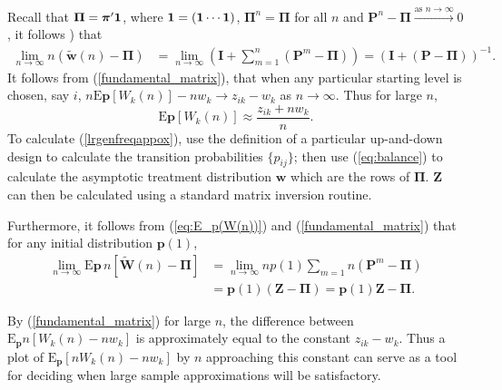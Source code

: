  Recall that $\boldsymbol{\Pi}=\boldsymbol{\pi}'\bf{1}$, where $\bf{1}=(1\cdots 1)$,
$\boldsymbol{\Pi}^n=\boldsymbol{\Pi}$ for all $n$ and
$\boldsymbol{P}^n-\boldsymbol{\Pi} \stackrel{\textrm{as } n \rightarrow \infty}\longrightarrow 0$,
 it follows  \citep[see][pg 22]{Keme:Snel:1960}) that
\begin{align}\label{fundamental_matrix}
\lim_{n \rightarrow \infty} n(\tilde{\mathbf{w}}(n)-\boldsymbol{\Pi})&=\lim_{n
\rightarrow \infty}\left({\mathbf{I}}+\sum_{m=1}^n\left(\mathbf{P}^m-\mathbf{\Pi}\right)\right) \nonumber =\left(\mathbf{I}+\left(\mathbf{P}-\boldsymbol{\Pi}\right)\right)^{-1}.
\end{align}
It follows from (\ref{fundamental_matrix}), that when any
particular starting level is chosen, say $i$,
$n\mathrm{E}{\mathbf{p}}\left[W_k(n)\right]-nw_k\rightarrow z_{ik}-w_k$ as $n
\rightarrow \infty$.  Thus for large $n$,
\begin{equation}\label{lrgenfreqappox}
\mathrm{E}{\mathbf{p}}\left[W_k(n)\right] \approx\frac{z_{ik}+nw_k}{n}.
\end{equation}
To calculate (\ref{lrgenfreqappox}), use the definition of a
particular up-and-down design to calculate the transition
probabilities $\{p_{ij}\}$; then use (\ref{eq:balance}) to
calculate the asymptotic treatment distribution $\mathbf{w}$ which
are the rows of $\boldsymbol{\Pi}$. $\mathbf{Z}$ can then be calculated using a
standard matrix inversion routine.

Furthermore, it follows from (\ref{eq:E_p(W(n))}) and
(\ref{fundamental_matrix}) that for any initial distribution $\mathbf{p}(1)$,
\begin{align}
\lim_{n \rightarrow \infty}\mathrm{E}{\mathbf{p}}\, n\left[\mathbf{{\tilde
W}}(n)-\boldsymbol{\Pi}\right]&=\lim_{n \rightarrow
\infty}np(1)\sum_{m=1}{n}\left(\mathbf{P}^m-\boldsymbol{\Pi}\right) \nonumber\\
&=\mathbf{p}(1)\left(\mathbf{Z}-\mathbf{\Pi}\right)
=\mathbf{p}(1)\mathbf{Z}-\boldsymbol{\Pi}.
\end{align}

By (\ref{fundamental_matrix}) for large $n$, the difference
between $\mathrm{E}_{\mathbf{p}}n\left[W_k(n)-nw_k\right]$ is approximately equal to
the constant $z_{ik}-w_k$. Thus a plot of
$\mathrm{E}_{\mathbf{p}}\left[nW_k(n)-nw_k\right]$ by $n$ approaching this constant can
serve as a tool for deciding when large sample approximations will
be satisfactory.
%
